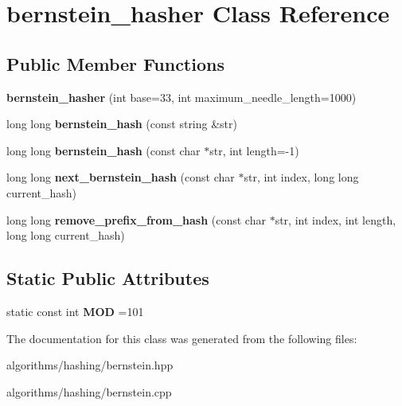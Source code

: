 \hypertarget{classbernstein__hasher}{\section{bernstein\+\_\+hasher Class Reference}
\label{classbernstein__hasher}
}
\subsection*{Public Member Functions}
\begin{DoxyCompactItemize}
\item 
\hypertarget{classbernstein__hasher_a3000e6b57d1d8b1aa1e7eab364393b7a}{{\bfseries bernstein\+\_\+hasher} (int base=33, int maximum\+\_\+needle\+\_\+length=1000)}\label{classbernstein__hasher_a3000e6b57d1d8b1aa1e7eab364393b7a}

\item 
\hypertarget{classbernstein__hasher_a0fdc166f2b194fb7531482ad2c9c9a3b}{long long {\bfseries bernstein\+\_\+hash} (const string \&str)}\label{classbernstein__hasher_a0fdc166f2b194fb7531482ad2c9c9a3b}

\item 
\hypertarget{classbernstein__hasher_a629ebbbf40151d70e80a23cf497fbff0}{long long {\bfseries bernstein\+\_\+hash} (const char $\ast$str, int length=-\/1)}\label{classbernstein__hasher_a629ebbbf40151d70e80a23cf497fbff0}

\item 
\hypertarget{classbernstein__hasher_a35677897233e3b7a2556adcb1cc15fbb}{long long {\bfseries next\+\_\+bernstein\+\_\+hash} (const char $\ast$str, int index, long long current\+\_\+hash)}\label{classbernstein__hasher_a35677897233e3b7a2556adcb1cc15fbb}

\item 
\hypertarget{classbernstein__hasher_ab83ee23ba9930624fcf7ec0ecc856fea}{long long {\bfseries remove\+\_\+prefix\+\_\+from\+\_\+hash} (const char $\ast$str, int index, int length, long long current\+\_\+hash)}\label{classbernstein__hasher_ab83ee23ba9930624fcf7ec0ecc856fea}

\end{DoxyCompactItemize}
\subsection*{Static Public Attributes}
\begin{DoxyCompactItemize}
\item 
\hypertarget{classbernstein__hasher_a25a1b74eba73eef405ee6c2ced22e357}{static const int {\bfseries M\+O\+D} =101}\label{classbernstein__hasher_a25a1b74eba73eef405ee6c2ced22e357}

\end{DoxyCompactItemize}


The documentation for this class was generated from the following files\+:\begin{DoxyCompactItemize}
\item 
algorithms/hashing/bernstein.\+hpp\item 
algorithms/hashing/bernstein.\+cpp\end{DoxyCompactItemize}
